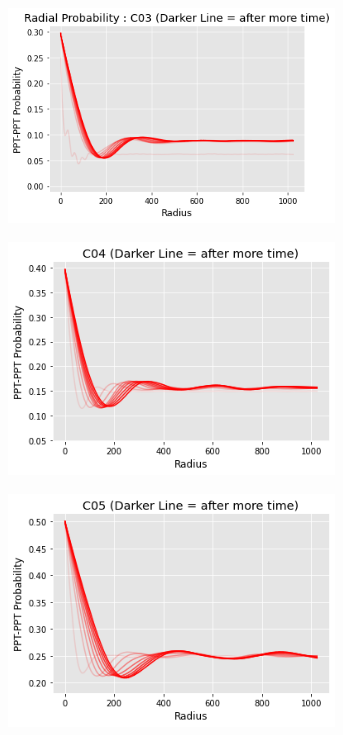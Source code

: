 \documentclass[12pt, a4paper]{report}
\begin{document}
\begin{figure}[H]
\centering
\begin{subfigure}{.48\textwidth}
  \centering
  \includegraphics[width=0.95\textwidth]{Pictures/MSFeatures/RadC03MovRight.png}
  \label{img:microstrImg}
\end{subfigure}
\begin{subfigure}{.48\textwidth}
  \centering
  \includegraphics[width=0.95\textwidth]{Pictures/MSFeatures/RadC04MovRight.png}
  \label{img:microstrImg}
\end{subfigure}
\begin{subfigure}{.48\textwidth}
  \centering
  \includegraphics[width=0.95\textwidth]{Pictures/MSFeatures/RadC05MovRight.png}
  \label{img:microstrImg}
\end{subfigure}


\end{figure}
\end{document}
